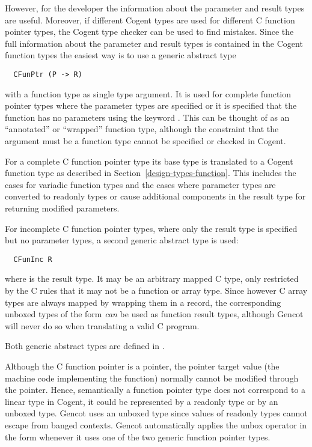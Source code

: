 However, for the developer the information about the parameter and result types are useful. Moreover, if different
Cogent types are used for different C function pointer types, the Cogent type checker can be used to find
mistakes. Since the full information about the parameter and result types is contained in the Cogent function types
the easiest way is to use a generic abstract type
\begin{verbatim}
  CFunPtr (P -> R)
\end{verbatim}
with a function type  as single type argument. It is used for complete function pointer types where the 
parameter types are specified or it is specified that the function has no parameters using the keyword . 
This can be thought of as an ``annotated'' or ``wrapped'' function type, although the constraint that the argument
must be a function type cannot be specified or checked in Cogent.

For a complete C function pointer type its base type is translated to a Cogent function type as described in
Section~\ref{design-types-function}. This includes the cases for variadic function types and the cases where
parameter types are converted to readonly types or cause additional components in the result type for returning 
modified parameters.

For incomplete C function pointer types, where only the result type
is specified but no parameter types, a second generic abstract type is used:
\begin{verbatim}
  CFunInc R
\end{verbatim}
where  is the result type. It may be an arbitrary 
mapped C type, only restricted by the C rules that it may not be a function or array type. Since however C array types
are always mapped by wrapping them in a record, the corresponding unboxed types of the form 
\textit{can} be used as function result types, although Gencot will never do so when translating a valid C program.

Both generic abstract types are defined in .

Although the C function pointer is a pointer, the pointer target value (the machine code implementing the function) 
normally cannot be modified through the pointer. Hence, semantically a function pointer type does not correspond to a linear type
in Cogent, it could be represented by a readonly type or by an unboxed type. Gencot uses an unboxed type
since values of readonly types cannot escape from banged contexts. Gencot automatically applies the 
unbox operator in the form  whenever it uses one of the two generic function pointer types.

